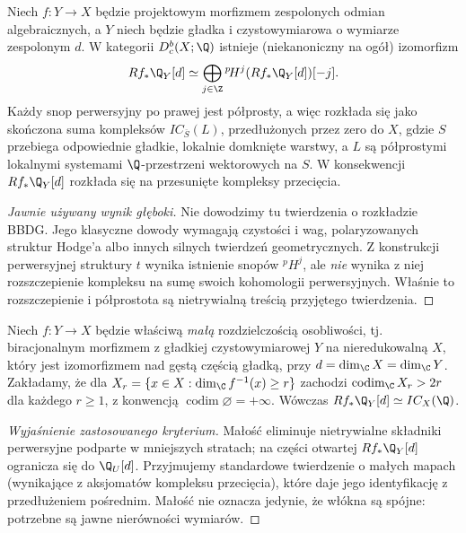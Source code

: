 \begin{twierdzenie}
\label{thm:decomposition-xiii}
Niech $f:Y\to X$ będzie projektowym morfizmem
zespolonych odmian algebraicznych, a $Y$
niech będzie gładka i czystowymiarowa o wymiarze
zespolonym $d$. W kategorii $D_c^b(X;\Q)$ istnieje
(niekanoniczny na ogół) izomorfizm
\[
Rf_*\Q_Y[d]\simeq
\bigoplus_{j\in\Z}{}^p\!H^j(Rf_*\Q_Y[d])[-j].
\]
Każdy snop perwersyjny po prawej jest półprosty,
a więc rozkłada się jako skończona suma kompleksów
$IC_{\overline S}(L)$, przedłużonych przez zero
do $X$, gdzie $S$ przebiega odpowiednie gładkie,
lokalnie domknięte warstwy, a $L$ są
półprostymi lokalnymi systemami $\Q$-przestrzeni
wektorowych na $S$. W konsekwencji
$Rf_*\Q_Y[d]$ rozkłada się na przesunięte
kompleksy przecięcia.
\end{twierdzenie}
\begin{proof}[Jawnie używany wynik głęboki]
Nie dowodzimy tu twierdzenia o rozkładzie BBDG.
Jego klasyczne dowody wymagają czystości i wag,
polaryzowanych struktur Hodge'a albo innych
silnych twierdzeń geometrycznych.
Z konstrukcji perwersyjnej struktury $t$ wynika
istnienie snopów ${}^p\!H^j$, ale \emph{nie}
wynika z niej rozszczepienie kompleksu na sumę
swoich kohomologii perwersyjnych.
Właśnie to rozszczepienie i półprostota są
nietrywialną treścią przyjętego twierdzenia.
\end{proof}
\begin{wniosek}
\label{cor:small-map-ic-xiii}
Niech $f:Y\to X$ będzie właściwą \emph{małą}
rozdzielczością osobliwości, tj. biracjonalnym
morfizmem z gładkiej czystowymiarowej
$Y$ na nieredukowalną $X$, który jest izomorfizmem
nad gęstą częścią gładką, przy $d=\dim_\C X=\dim_\C Y$.
Zakładamy, że dla $X_r=\{x\in X:\dim_\C f^{-1}(x)\ge r\}$
zachodzi $\operatorname{codim}_\C X_r>2r$ dla każdego
$r\ge1$, z konwencją $\operatorname{codim}\varnothing=+\infty$.
Wówczas $Rf_*\Q_Y[d]\simeq IC_X(\Q)$.
\end{wniosek}
\begin{proof}[Wyjaśnienie zastosowanego kryterium]
Małość eliminuje nietrywialne składniki
perwersyjne podparte w mniejszych stratach;
na części otwartej $Rf_*\Q_Y[d]$ ogranicza się
do $\Q_U[d]$. Przyjmujemy standardowe twierdzenie
o małych mapach (wynikające z aksjomatów
kompleksu przecięcia), które daje jego
identyfikację z przedłużeniem pośrednim.
Małość nie oznacza jedynie, że włókna są spójne:
potrzebne są jawne nierówności wymiarów.
\end{proof}

